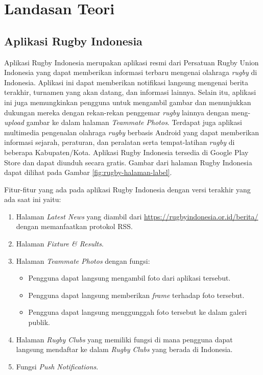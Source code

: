 
\chapter{Landasan Teori}
\label{chap:teori}

\section{Aplikasi Rugby Indonesia}
\label{sec:skripsi} 
    Aplikasi Rugby Indonesia merupakan aplikasi resmi dari Persatuan Rugby Union Indonesia yang dapat memberikan informasi terbaru mengenai olahraga \textit{rugby} di Indonesia. Aplikasi ini dapat memberikan notifikasi langsung mengenai berita terakhir, turnamen yang akan datang, dan informasi lainnya. Selain itu, aplikasi ini juga memungkinkan pengguna untuk mengambil gambar dan menunjukkan dukungan mereka dengan rekan-rekan penggemar \textit{rugby} lainnya dengan meng-\textit{upload} gambar ke dalam halaman \textit{Teammate Photos}. Terdapat juga aplikasi multimedia pengenalan olahraga \textit{rugby} berbasis Android yang dapat memberikan informasi sejarah, peraturan, dan peralatan serta tempat-latihan \textit{rugby} di beberapa Kabupaten/Kota. Aplikasi Rugby Indonesia tersedia di Google Play Store dan dapat diunduh secara gratis. Gambar dari halaman Rugby Indonesia dapat dilihat pada Gambar \ref{fig:rugby-halaman-label}.


    Fitur-fitur yang ada pada aplikasi Rugby Indonesia dengan versi terakhir yang ada saat ini yaitu:

    \begin{enumerate}
        \item Halaman \textit{Latest News} yang diambil dari \url{https://rugbyindonesia.or.id/berita/} dengan memanfaatkan protokol RSS. 
        \item Halaman \textit{Fixture \& Results}.
        \item Halaman \textit{Teammate Photos} dengan fungsi:
        \begin{itemize}
            \item Pengguna dapat langsung mengambil foto dari aplikasi tersebut.
            \item Pengguna dapat langsung memberikan \textit{frame} terhadap foto tersebut.
            \item Pengguna dapat langsung menggunggah foto tersebut ke dalam galeri publik.
        \end{itemize}
    \item Halaman \textit{Rugby Clubs} yang memiliki fungsi di mana pengguna dapat langsung mendaftar ke dalam \textit{Rugby Clubs} yang berada di Indonesia.
    \item Fungsi \textit{Push Notifications}.
    \end{enumerate}
    
